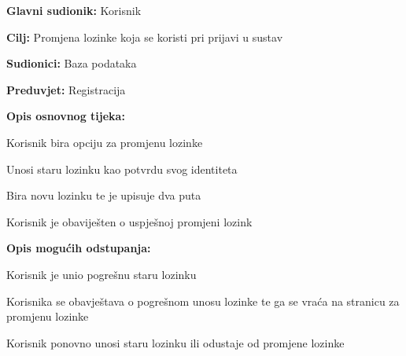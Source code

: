 				\noindent {}
				\begin{packed_item}
					
					\item \textbf{Glavni sudionik: } Korisnik
					\item  \textbf{Cilj:} Promjena lozinke koja se koristi pri prijavi u sustav
					\item  \textbf{Sudionici:} Baza podataka
					\item  \textbf{Preduvjet:} Registracija
					\item  \textbf{Opis osnovnog tijeka:}
					
					\item[] \begin{packed_enum}
						
						\item Korisnik bira opciju za promjenu lozinke
						\item Unosi staru lozinku kao potvrdu svog identiteta
						\item Bira novu lozinku te je upisuje dva puta
						\item Korisnik je obaviješten o uspješnoj promjeni lozink
					\end{packed_enum}
					
					\item  \textbf{Opis mogućih odstupanja:}
					
					\item[] \begin{packed_item}
						
						\item[2.a] Korisnik je unio pogrešnu staru lozinku
						\item[] \begin{packed_enum}
							
							\item Korisnika se obavještava o pogrešnom unosu lozinke te ga se vraća na stranicu za promjenu lozinke
							\item Korisnik ponovno unosi staru lozinku ili odustaje od promjene lozinke
							
						\end{packed_enum}
					\end{packed_item}
				\end{packed_item}
				

